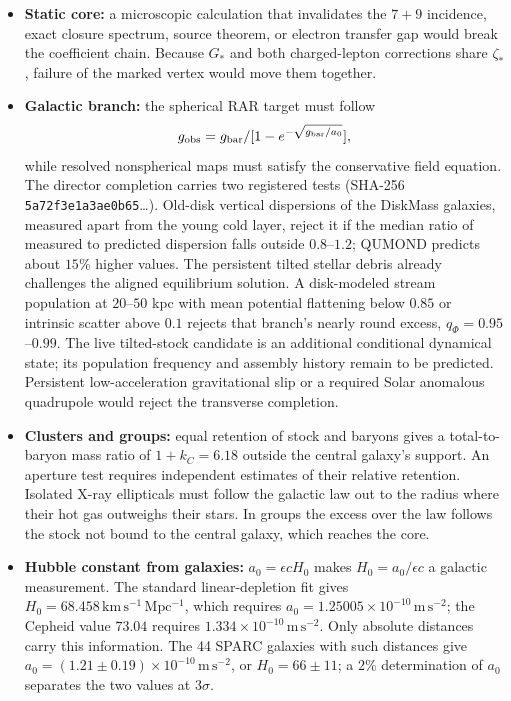 \documentclass[11pt]{article}
\begin{document}
\begin{itemize}
\item \textbf{Static core:} a microscopic calculation that invalidates the $7+9$ incidence, exact closure spectrum, source theorem, or electron transfer gap would break the coefficient chain. Because $G_*$ and both charged-lepton corrections share $\zeta_*$, failure of the marked vertex would move them together.
\item \textbf{Galactic branch:} the spherical RAR target must follow
\[
g_{\rm obs}=g_{\rm bar}/[1-e^{-\sqrt{g_{\rm bar}/a_0}}],
\]
while resolved nonspherical maps must satisfy the conservative field equation. The director completion carries two registered tests (SHA-256 \texttt{5a72f3e1a3ae0b65}\ldots). Old-disk vertical dispersions of the DiskMass galaxies, measured apart from the young cold layer, reject it if the median ratio of measured to predicted dispersion falls outside $0.8$--$1.2$; QUMOND predicts about $15\%$ higher values. The persistent tilted stellar debris already challenges the aligned equilibrium solution. A disk-modeled stream population at $20$--$50$ kpc with mean potential flattening below $0.85$ or intrinsic scatter above $0.1$ rejects that branch's nearly round excess, $q_\Phi=0.95$--$0.99$. The live tilted-stock candidate is an additional conditional dynamical state; its population frequency and assembly history remain to be predicted. Persistent low-acceleration gravitational slip or a required Solar anomalous quadrupole would reject the transverse completion.
\item \textbf{Clusters and groups:} equal retention of stock and baryons gives a total-to-baryon mass ratio of $1+k_C=6.18$ outside the central galaxy's support. An aperture test requires independent estimates of their relative retention. Isolated X-ray ellipticals must follow the galactic law out to the radius where their hot gas outweighs their stars. In groups the excess over the law follows the stock not bound to the central galaxy, which reaches the core.
\item \textbf{Hubble constant from galaxies:} $a_0=\epsilon cH_0$ makes $H_0=a_0/\epsilon c$ a galactic measurement. The standard linear-depletion fit gives $H_0=68.458\,\mathrm{km\,s^{-1}\,Mpc^{-1}}$, which requires $a_0=1.25005\times10^{-10}\,\mathrm{m\,s^{-2}}$; the Cepheid value $73.04$ \citep{Riess2022} requires $1.334\times10^{-10}\,\mathrm{m\,s^{-2}}$. Only absolute distances carry this information. The 44 SPARC galaxies with such distances \citep{Lelli2016} give $a_0=(1.21\pm0.19)\times10^{-10}\,\mathrm{m\,s^{-2}}$, or $H_0=66\pm11$; a $2\%$ determination of $a_0$ separates the two values at $3\sigma$.

\end{itemize}
\end{document}
